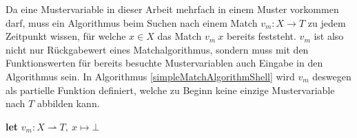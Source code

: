 Da eine Mustervariable in dieser Arbeit mehrfach in einem Muster vorkommen darf, muss ein Algorithmus beim Suchen nach einem Match $v_m \colon X \rightarrow T$ zu jedem Zeitpunkt wissen, für welche $x \in X$ das Match $v_m~x$ bereits feststeht. $v_m$ ist also nicht nur Rückgabewert eines Matchalgorithmus, sondern muss mit den Funktionswerten für bereits besuchte Mustervariablen auch Eingabe in den Algorithmus sein. In Algorithmus \ref{simpleMatchAlgorithmShell} wird $v_m$ deswegen als partielle Funktion definiert, welche zu Beginn keine einzige Mustervariable nach $T$ abbilden kann. \\

\begin{algorithm}
\DontPrintSemicolon
\caption{$\mathrm{simpleMatchAlgorithmShell} \colon M \times T \rightarrow (B, X \rightharpoonup T)$}\label{simpleMatchAlgorithmShell}

\textbf{let} $v_m \colon X \rightharpoonup T,~ x \mapsto \bot$\;
\end{algorithm}

\begin{algorithm}
\DontPrintSemicolon
\caption{$\mathrm{simpleMatchAlgorithm} \colon M \times T \times (X \rightharpoonup T) \rightarrow (B, X \rightharpoonup T)$}\label{simpleMatchAlgorithm}

 {
}
\end{algorithm}


